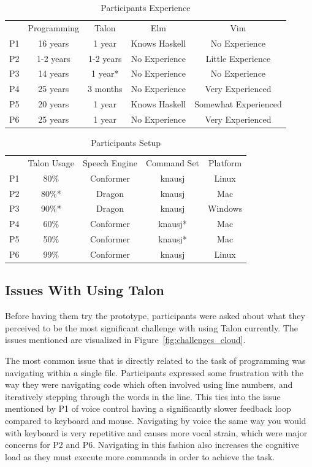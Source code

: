 \documentclass[../thesis.tex]{subfiles}
\begin{document}
\begin{table}[htpb]
    \centering
    \label{tab:experience}
    \begin{tabular}{|c|c|c|c|c}
           & Programming&Talon&Elm&Vim\\
        P1 & 16 years&1 year&Knows Haskell&No Experience\\
        P2 & 1-2 years&1-2 years&No Experience&Little Experience\\
        P3 & 14 years&1 year*&No Experience&No Experience\\
        P4 & 25 years&3 months&No Experience&Very Experienced\\
        P5 & 20 years&1 year&Knows Haskell&Somewhat Experienced\\
        P6 & 25 years&1 year&No Experience&Very Experienced\\
    \end{tabular}
    \caption{Participants Experience}
\end{table}


\begin{table}[htpb]
    \centering
    \label{tab:setup}
    \begin{tabular}{|c|c|c|c|c}
        & Talon Usage&Speech Engine&Command Set&Platform\\
        P1 &80\%&Conformer&knausj&Linux\\
        P2 &80\%*&Dragon&knausj&Mac\\
        P3 &90\%*&Dragon&knausj&Windows\\
        P4 &60\%&Conformer&knausj*&Mac\\
        P5 &50\%&Conformer&knausj*&Mac\\
        P6 &99\%&Conformer&knausj&Linux\\
    \end{tabular}
    \caption{Participants Setup}
\end{table}

\subsection{Issues With Using Talon}%
\label{sub:issues_with_talon}
Before having them try the prototype, participants were asked about what they perceived to be the most significant challenge
with using Talon currently.
The issues mentioned are visualized in Figure~\ref{fig:challenges_cloud}.

The most common issue that is directly related to the task of programming was navigating within a single file.
Participants expressed some frustration with the way they were navigating
code which often involved using line numbers, and iteratively stepping through the words in the line.
This ties into the issue mentioned by P1 of voice control having a significantly slower feedback loop
compared to keyboard and mouse.
Navigating by voice the same way you would with keyboard is very repetitive
and causes more vocal strain, which were major concerns for P2 and P6.
Navigating in this fashion also increases the cognitive load as they must execute more
commands in order to achieve the task.
\end{document}
